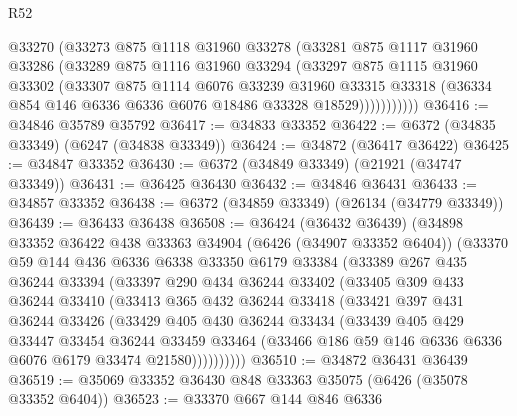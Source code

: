 \begin{lexlean}{R52}
\begin{coremodule}
              @33270
              (@33273
                @875
                @1118
                @31960
                @33278
                (@33281
                  @875
                  @1117
                  @31960
                  @33286
                  (@33289
                    @875
                    @1116
                    @31960
                    @33294
                    (@33297
                      @875
                      @1115
                      @31960
                      @33302
                      (@33307
                        @875
                        @1114
                        @6076
                        @33239
                        @31960
                        @33315
                        @33318
                        (@36334 @854 @146 @6336 @6336 @6076 @18486 @33328 @18529)))))))))))
@36416 := @34846 @35789 @35792
@36417 := @34833 @33352
@36422 := @6372 (@34835 @33349) (@6247 (@34838 @33349))
@36424 := @34872 (@36417 @36422)
@36425 := @34847 @33352
@36430 := @6372 (@34849 @33349) (@21921 (@34747 @33349))
@36431 := @36425 @36430
@36432 := @34846 @36431
@36433 := @34857 @33352
@36438 := @6372 (@34859 @33349) (@26134 (@34779 @33349))
@36439 := @36433 @36438
@36508 := @36424
    (@36432 @36439)
    (@34898
      @33352
      @36422
      @438
      @33363
      @34904
      (@6426 (@34907 @33352 @6404))
      (@33370
        @59
        @144
        @436
        @6336
        @6338
        @33350
        @6179
        @33384
        (@33389
          @267
          @435
          @36244
          @33394
          (@33397
            @290
            @434
            @36244
            @33402
            (@33405
              @309
              @433
              @36244
              @33410
              (@33413
                @365
                @432
                @36244
                @33418
                (@33421
                  @397
                  @431
                  @36244
                  @33426
                  (@33429
                    @405
                    @430
                    @36244
                    @33434
                    (@33439
                      @405
                      @429
                      @33447
                      @33454
                      @36244
                      @33459
                      @33464
                      (@33466 @186 @59 @146 @6336 @6336 @6076 @6179 @33474 @21580))))))))))
@36510 := @34872 @36431 @36439
@36519 := @35069 @33352 @36430 @848 @33363 @35075 (@6426 (@35078 @33352 @6404))
@36523 := @33370 @667 @144 @846 @6336

\end{coremodule}
\end{lexlean}
